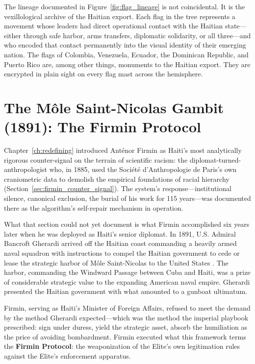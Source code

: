 The lineage documented in Figure~\ref{fig:flag_lineage} is not coincidental. It is the vexillological archive of the Haitian export. Each flag in the tree represents a movement whose leaders had direct operational contact with the Haitian state---either through safe harbor, arms transfers, diplomatic solidarity, or all three---and who encoded that contact permanently into the visual identity of their emerging nation. The flags of Colombia, Venezuela, Ecuador, the Dominican Republic, and Puerto Rico are, among other things, monuments to the Haitian export. They are encrypted in plain sight on every flag mast across the hemisphere.

\section{The Môle Saint-Nicolas Gambit (1891): The Firmin Protocol}
\label{sec:firmin_protocol}

Chapter~\ref{ch:redefining} introduced Anténor Firmin as Haiti's most analytically rigorous counter-signal on the terrain of scientific racism: the diplomat-turned-anthropologist who, in 1885, used the Société d'Anthropologie de Paris's own craniometric data to demolish the empirical foundations of racial hierarchy (Section~\ref{sec:firmin_counter_signal}). The system's response---institutional silence, canonical exclusion, the burial of his work for 115 years---was documented there as the algorithm's self-repair mechanism in operation.

What that section could not yet document is what Firmin accomplished six years later when he was deployed as Haiti's senior diplomat. In 1891, U.S. Admiral Bancroft Gherardi arrived off the Haitian coast commanding a heavily armed naval squadron with instructions to compel the Haitian government to cede or lease the strategic harbor of Môle Saint-Nicolas to the United States \cite{james_black_jacobins, dubois_avengers_new_world}. The harbor, commanding the Windward Passage between Cuba and Haiti, was a prize of considerable strategic value to the expanding American naval empire. Gherardi presented the Haitian government with what amounted to a gunboat ultimatum.

Firmin, serving as Haiti's Minister of Foreign Affairs, refused to meet the demand by the method Gherardi expected---which was the method the imperial playbook prescribed: sign under duress, yield the strategic asset, absorb the humiliation as the price of avoiding bombardment. Firmin executed what this framework terms the \textbf{Firmin Protocol}: the weaponization of the Elite's own legitimation rules against the Elite's enforcement apparatus.


